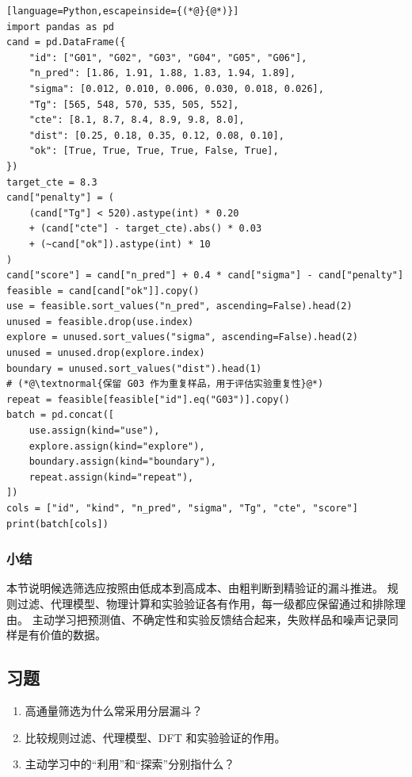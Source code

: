 \begin{lstlisting}[language=Python,escapeinside={(*@}{@*)}]
import pandas as pd
cand = pd.DataFrame({
    "id": ["G01", "G02", "G03", "G04", "G05", "G06"],
    "n_pred": [1.86, 1.91, 1.88, 1.83, 1.94, 1.89],
    "sigma": [0.012, 0.010, 0.006, 0.030, 0.018, 0.026],
    "Tg": [565, 548, 570, 535, 505, 552],
    "cte": [8.1, 8.7, 8.4, 8.9, 9.8, 8.0],
    "dist": [0.25, 0.18, 0.35, 0.12, 0.08, 0.10],
    "ok": [True, True, True, True, False, True],
})
target_cte = 8.3
cand["penalty"] = (
    (cand["Tg"] < 520).astype(int) * 0.20
    + (cand["cte"] - target_cte).abs() * 0.03
    + (~cand["ok"]).astype(int) * 10
)
cand["score"] = cand["n_pred"] + 0.4 * cand["sigma"] - cand["penalty"]
feasible = cand[cand["ok"]].copy()
use = feasible.sort_values("n_pred", ascending=False).head(2)
unused = feasible.drop(use.index)
explore = unused.sort_values("sigma", ascending=False).head(2)
unused = unused.drop(explore.index)
boundary = unused.sort_values("dist").head(1)
# (*@\textnormal{保留 G03 作为重复样品，用于评估实验重复性}@*)
repeat = feasible[feasible["id"].eq("G03")].copy()
batch = pd.concat([
    use.assign(kind="use"),
    explore.assign(kind="explore"),
    boundary.assign(kind="boundary"),
    repeat.assign(kind="repeat"),
])
cols = ["id", "kind", "n_pred", "sigma", "Tg", "cte", "score"]
print(batch[cols])
\end{lstlisting}


\subsubsection*{\textbf{小结}}

本节说明候选筛选应按照由低成本到高成本、由粗判断到精验证的漏斗推进。
规则过滤、代理模型、物理计算和实验验证各有作用，每一级都应保留通过和排除理由。
主动学习把预测值、不确定性和实验反馈结合起来，失败样品和噪声记录同样是有价值的数据。

\subsection*{习题}

\begin{enumerate}[leftmargin=*]
\item 高通量筛选为什么常采用分层漏斗？
\item 比较规则过滤、代理模型、DFT 和实验验证的作用。
\item 主动学习中的“利用”和“探索”分别指什么？
\end{enumerate}

